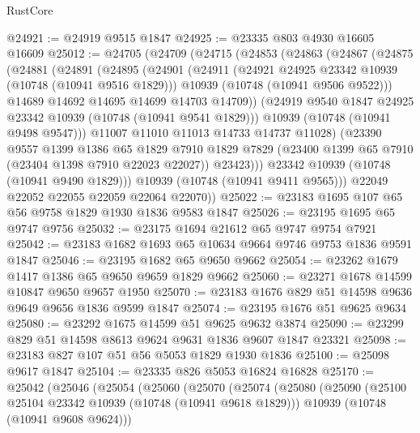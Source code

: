 \begin{lexlean}{RustCore}
\begin{coremodule}
@24921 := @24919 @9515 @1847
@24925 := @23335 @803 @4930 @16605 @16609
@25012 := @24705
    (@24709
      (@24715
        (@24853
          (@24863
            (@24867
              (@24875
                (@24881
                  (@24891
                    (@24895
                      (@24901
                        (@24911
                          (@24921 @24925 @23342 @10939 (@10748 (@10941 @9516 @1829)))
                          @10939
                          (@10748 (@10941 @9506 @9522)))
                        @14689
                        @14692
                        @14695
                        @14699
                        @14703
                        @14709))
                    (@24919 @9540 @1847 @24925 @23342 @10939 (@10748 (@10941 @9541 @1829)))
                    @10939
                    (@10748 (@10941 @9498 @9547)))
                  @11007
                  @11010
                  @11013
                  @14733
                  @14737
                  @11028)
                (@23390
                  @9557
                  @1399
                  @1386
                  @65
                  @1829
                  @7910
                  @1829
                  @7829
                  (@23400 @1399 @65 @7910 (@23404 @1398 @7910 @22023 @22027))
                  @23423)))
            @23342
            @10939
            (@10748 (@10941 @9490 @1829)))
          @10939
          (@10748 (@10941 @9411 @9565)))
        @22049
        @22052
        @22055
        @22059
        @22064
        @22070))
@25022 := @23183 @1695 @107 @65 @56 @9758 @1829 @1930 @1836 @9583 @1847
@25026 := @23195 @1695 @65 @9747 @9756
@25032 := @23175 @1694 @21612 @65 @9747 @9754 @7921
@25042 := @23183 @1682 @1693 @65 @10634 @9664 @9746 @9753 @1836 @9591 @1847
@25046 := @23195 @1682 @65 @9650 @9662
@25054 := @23262 @1679 @1417 @1386 @65 @9650 @9659 @1829 @9662
@25060 := @23271 @1678 @14599 @10847 @9650 @9657 @1950
@25070 := @23183 @1676 @829 @51 @14598 @9636 @9649 @9656 @1836 @9599 @1847
@25074 := @23195 @1676 @51 @9625 @9634
@25080 := @23292 @1675 @14599 @51 @9625 @9632 @3874
@25090 := @23299 @829 @51 @14598 @8613 @9624 @9631 @1836 @9607 @1847 @23321
@25098 := @23183 @827 @107 @51 @56 @5053 @1829 @1930 @1836
@25100 := @25098 @9617 @1847
@25104 := @23335 @826 @5053 @16824 @16828
@25170 := @25042
    (@25046
      (@25054
        (@25060
          (@25070
            (@25074
              (@25080
                (@25090
                  (@25100 @25104 @23342 @10939 (@10748 (@10941 @9618 @1829)))
                  @10939
                  (@10748 (@10941 @9608 @9624)))

\end{coremodule}
\end{lexlean}
